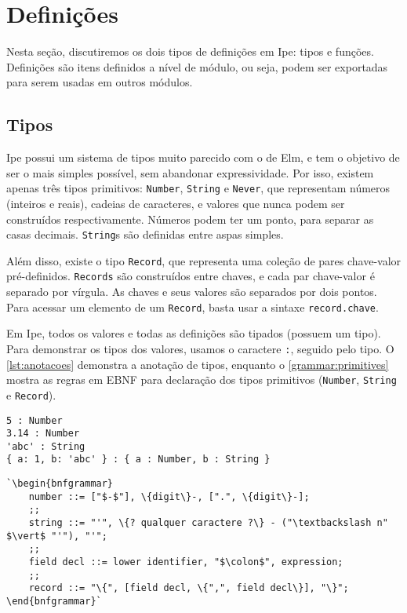 \section{Definições}\label{sec:definicoes}

Nesta seção, discutiremos os dois tipos de definições em Ipe: tipos e funções.
Definições são itens definidos a nível de módulo, ou seja, podem ser exportadas
para serem usadas em outros módulos.

\subsection{Tipos}\label{sec:tipos}

Ipe possui um sistema de tipos muito parecido com o de Elm, e tem o objetivo de
ser o mais simples possível, sem abandonar expressividade. Por isso, existem
apenas três tipos primitivos: \texttt{Number}, \texttt{String} e \texttt{Never},
que representam números (inteiros e reais), cadeias de caracteres, e valores que
nunca podem ser construídos respectivamente. Números podem ter um ponto,
para separar as casas decimais. \texttt{String}s são definidas entre aspas simples.

Além disso, existe o tipo \texttt{Record}, que representa uma coleção de pares
chave-valor pré-definidos. \texttt{Records} são construídos entre chaves, e cada
par chave-valor é separado por vírgula. As chaves e seus valores são separados por
dois pontos. Para acessar um elemento de um \texttt{Record}, basta usar a sintaxe
\texttt{record.chave}.


Em Ipe, todos os valores e todas as definições são tipados (possuem um tipo). Para
demonstrar os tipos dos valores, usamos o caractere \texttt{:}, seguido pelo tipo.
O \autoref{lst:anotacoes} demonstra a anotação de tipos, enquanto o
\autoref{grammar:primitives} mostra as regras em EBNF para declaração dos tipos
primitivos (\texttt{Number}, \texttt{String} e \texttt{Record}).

\begin{lstlisting}[label={lst:anotacoes},caption={Exemplo de anotação de tipos}]
5 : Number
3.14 : Number
'abc' : String
{ a: 1, b: 'abc' } : { a : Number, b : String }
\end{lstlisting}

\begin{lstlisting}[label={grammar:primitives},caption={Definição dos tipos primitivos em Ipe em EBNF. A regra \texttt{expression} está descrita no \autoref{apendix:ebnf-syntax}},escapechar=`,numbers=none]
`\begin{bnfgrammar}
    number ::= ["$-$"], \{digit\}-, [".", \{digit\}-];
    ;;
    string ::= "'", \{? qualquer caractere ?\} - ("\textbackslash n" $\vert$ "'"), "'";
    ;;
    field decl ::= lower identifier, "$\colon$", expression;
    ;;
    record ::= "\{", [field decl, \{",", field decl\}], "\}";
\end{bnfgrammar}`
\end{lstlisting}


